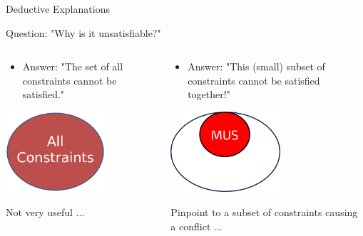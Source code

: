\documentclass{cons-beamer}
\begin{document}
\begin{frame}{Deductive Explanations}
  \begin{center}
    Question: "Why is it unsatisfiable?"
  \end{center}
  \begin{columns}
    \begin{column}{0.5\textwidth}
      \begin{itemize}
        \item Answer: "The set of all constraints cannot be satisfied."
      \end{itemize}
      \begin{center}
        \includegraphics[height=30mm]{images/texpl_img/allcons.png}
      \end{center}

      Not very useful ...
      \vfill
    \end{column}    
    \begin{column}{0.5\textwidth}
      \begin{itemize}  
        \item Answer: "This (small) subset of constraints cannot be satisfied together!"
      \end{itemize}
      \begin{center}
        \includegraphics[height=30mm]{images/texpl_img/mus.png}
      \end{center}
      
      Pinpoint to a subset of constraints causing a conflict ... 
      \vfill
    \end{column}    
  \end{columns}
\end{frame}
\end{document}
